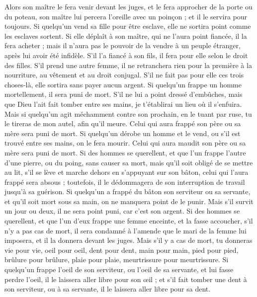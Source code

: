 \begin{multicols}{2}
Alors son maître le fera venir devant les juges, et le fera approcher de la porte ou du poteau, son maître lui percera l'oreille avec un poinçon ; et il le servira pour toujours.
Si quelqu'un vend sa fille pour être esclave, elle ne sortira point comme les esclaves sortent.
Si elle déplaît à son maître, qui ne l'aura point fiancée, il la fera acheter ; mais il n'aura pas le pouvoir de la vendre à un peuple étranger, après lui avoir été infidèle.
S'il l'a fiancé à son fils, il fera pour elle selon le droit des filles.
S’il prend une autre femme, il ne retranchera rien pour la première à la nourriture, au vêtement et au droit conjugal.
S'il ne fait pas pour elle ces trois choses-là, elle sortira sans payer aucun argent.
Si quelqu'un frappe un homme mortellement, il sera puni de mort.
S'il ne lui a point dressé d'embûches, mais que Dieu l'ait fait tomber entre ses mains, je t'établirai un lieu où il s'enfuira.
Mais si quelqu'un agit méchamment contre son prochain, en le tuant par ruse, tu le tireras de mon autel, afin qu'il meure.
Celui qui aura frappé son père ou sa mère sera puni de mort.
Si quelqu'un dérobe un homme et le vend, ou s'il est trouvé entre ses mains, on le fera mourir.
Celui qui aura maudit son père ou sa mère sera puni de mort.
Si des hommes se querellent, et que l'un frappe l'autre d'une pierre, ou du poing, sans causer sa mort, mais qu'il soit obligé de se mettre au lit,
s'il se lève et marche dehors en s'appuyant sur son bâton, celui qui l'aura frappé sera absous ; toutefois, il le dédommagera de son interruption de travail jusqu’à sa guérison.
Si quelqu'un a frappé du bâton son serviteur ou sa servante, et qu'il soit mort sous sa main, on ne manquera point de le punir.
Mais s'il survit un jour ou deux, il ne sera point puni, car c'est son argent.
Si des hommes se querellent, et que l'un d'eux frappe une femme enceinte, et la fasse accoucher, s'il n'y a pas cas de mort, il sera condamné à l'amende que le mari de la femme lui imposera, et il la donnera devant les juges.
Mais s'il y a cas de mort, tu donneras vie pour vie,
oeil pour oeil, dent pour dent, main pour main, pied pour pied\FTNT{},
brûlure pour brûlure, plaie pour plaie, meurtrissure pour meurtrissure.
Si quelqu'un frappe l'oeil de son serviteur, ou l'oeil de sa servante, et lui fasse perdre l'oeil, il le laissera aller libre pour son œil ;
et s'il fait tomber une dent à son serviteur, ou à sa servante, il le laissera aller libre pour sa dent.

\end{multicols}
